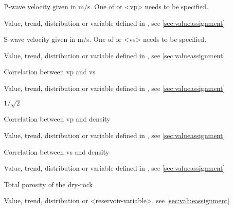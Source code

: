{
 \slist
   \item \Description P-wave velocity given in m/s. One of  or <vp> needs to be specified.
   \item \Argument Value, trend, distribution or variable defined in , see \autoref{sec:valueassignment}
   \item \Default 
 \elist

 \slist
   \item \Description S-wave velocity given in m/s. One of  or <vs> needs to be specified.
   \item \Argument Value, trend, distribution or variable defined in , see \autoref{sec:valueassignment}
   \item \Default 
 \elist

 \slist
   \item \Description Correlation between vp and vs
   \item \Argument Value, trend, distribution or variable defined in , see \autoref{sec:valueassignment}
   \item \Default $1/\sqrt{2}$
 \elist

 \slist
   \item \Description Correlation between vp and density
   \item \Argument Value, trend, distribution or variable defined in , see \autoref{sec:valueassignment}
   \item {}
 \elist

 \slist
   \item \Description Correlation between vs and density
   \item \Argument Value, trend, distribution or variable defined in , see \autoref{sec:valueassignment}
   \item {}
 \elist

 \slist
   \item \Description Total porosity of the dry-rock
   \item \Argument Value, trend, distribution or <reservoir-variable>, see \autoref{sec:valueassignment}
   \item \Default 
 \elist

}

